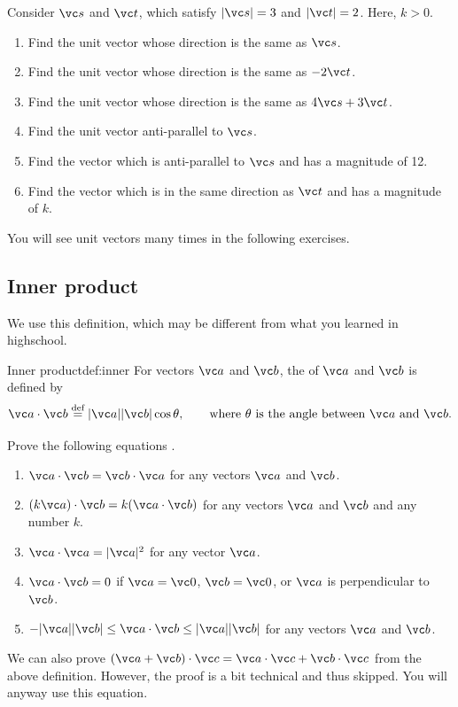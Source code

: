 \documentclass[11pt,pdfa,lastpage]{MishoNote}
\begin{document}
\begin{problems}
 \Problem[A] Consider $\vc s$ and $\vc t$, which satisfy $|\vc s|=3$ and $|\vc t|=2$. Here, $k>0$.
 \begin{enumerate}
   \item Find the unit vector whose direction is the same as $\vc s$.
   \item Find the unit vector whose direction is the same as $-2\vc t$.
   \item Find the unit vector whose direction is the same as $4\vc s+3\vc t$.
   \item Find the unit vector anti-parallel to $\vc s$.
   \item Find the vector which is anti-parallel to $\vc s$ and has a magnitude of 12.
   \item Find the vector which is in the same direction as $\vc t$ and has a magnitude of $k$.
 \end{enumerate}
\end{problems}

You will see unit vectors many times in the following exercises.

\newpage
\subsection{Inner product}
We use this definition, which may be different from what you learned in highschool.
\begin{definition}{Inner product}{def:inner}
  For vectors $\vc a$ and $\vc b$, the  of $\vc a$ and $\vc b$ is defined by
  \[ \vc a\cdot\vc b\defeq|\vc a||\vc b|\cos\theta, \qquad \text{where $\theta$ is the angle between $\vc a$ and $\vc b$.} \]
\end{definition}
\begin{problems}
  \Problem[A] Prove the following equations .
  \begin{enumerate}
    \item $\vc a\cdot\vc b=\vc b\cdot\vc a$ for any vectors $\vc a$ and $\vc b$.
    \item $(k\vc a)\cdot\vc b=k(\vc a\cdot\vc b)$ for any vectors $\vc a$ and $\vc b$ and any number $k$.
    \item $\vc a\cdot\vc a=|\vc a|^2$ for any vector $\vc a$.
    \item $\vc a\cdot\vc b=0$ if $\vc a=\vc 0$, $\vc b=\vc 0$, or $\vc a$ is perpendicular to $\vc b$.
    \item $-|\vc a||\vc b|\le \vc a\cdot\vc b\le|\vc a||\vc b|$ for any vectors $\vc a$ and $\vc b$.
  \end{enumerate}
\end{problems}
We can also prove $(\vc a+\vc b)\cdot\vc c=\vc a\cdot\vc c+\vc b\cdot \vc c$ from the above definition. However, the proof is a bit technical and thus skipped. You will anyway use this equation.
\end{document}
